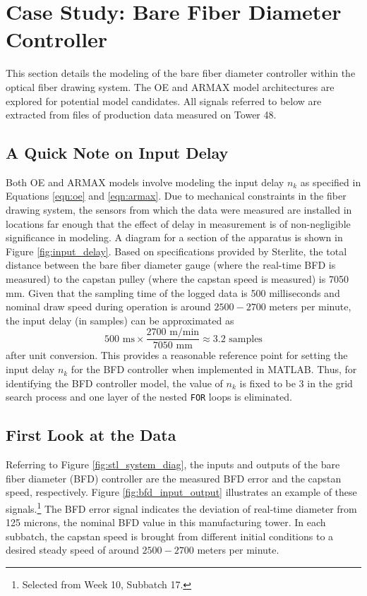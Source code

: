 \section{Case Study: Bare Fiber Diameter Controller} \label{ch:sysid:case}

This section details the modeling of the bare fiber diameter controller within the optical fiber drawing system. The OE and ARMAX model architectures are explored for potential model candidates. All signals referred to below are extracted from files of production data measured on Tower 48. 

\subsection*{A Quick Note on Input Delay}

Both OE and ARMAX models involve modeling the input delay $n_k$ as specified in Equations \ref{eqn:oe} and \ref{eqn:armax}. Due to mechanical constraints in the fiber drawing system, the sensors from which the data were measured are installed in locations far enough that the effect of delay in measurement is of non-negligible significance in modeling. A diagram for a section of the apparatus is shown in Figure \ref{fig:input_delay}. Based on specifications provided by Sterlite, the total distance between the bare fiber diameter gauge (where the real-time BFD is measured) to the capstan pulley (where the capstan speed is measured) is 7050 mm. Given that the sampling time of the logged data is 500 milliseconds and nominal draw speed during operation is around $2500 - 2700$ meters per minute, the input delay (in samples) can be approximated as 
\begin{equation}
    \label{eqn:inp_delay_3}
    500\text{ ms} \times \frac{2700 \text{ m/min}}{7050 \text{ mm}} \approx 3.2 \text{ samples}
\end{equation}
after unit conversion. This provides a reasonable reference point for setting the input delay $n_k$ for the BFD controller when implemented in MATLAB. Thus, for identifying the BFD controller model, the value of $n_k$ is fixed to be $3$ in the grid search process and one layer of the nested \texttt{FOR} loops is eliminated. 

\subsection*{First Look at the Data}

Referring to Figure \ref{fig:stl_system_diag}, the inputs and outputs of the bare fiber diameter (BFD) controller are the measured BFD error and the capstan speed, respectively. Figure \ref{fig:bfd_input_output} illustrates an example of these signals.\footnote{Selected from Week 10, Subbatch 17.} The BFD error signal indicates the deviation of real-time diameter from 125 microns, the nominal BFD value in this manufacturing tower. In each subbatch, the capstan speed is brought from different initial conditions to a desired steady speed of around $2500 - 2700$ meters per minute. 

